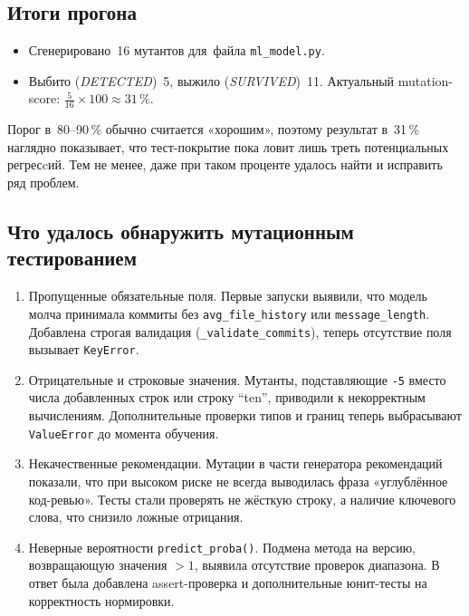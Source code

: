 \vspace{0.7em}
\subsection{Итоги прогона}

\begin{itemize}
	\item Сгенерировано~16 мутантов для~файла \texttt{ml\_model.py}.
	\item Выбито (\textit{DETECTED})~5, выжило (\textit{SURVIVED})~11.  
	Актуальный mutation-score: $\frac{5}{16}\!\times\!100 \approx 31\,\%$.
\end{itemize}

Порог в~80--90\,\% обычно считается «хорошим»,
поэтому результат в~31\,\% наглядно показывает,
что тест-покрытие пока ловит лишь треть потенциальных регресcий.
Тем не менее, даже при таком проценте удалось найти и исправить ряд проблем.

\vspace{0.7em}
\subsection{Что удалось обнаружить мутационным тестированием}

\begin{enumerate}
	\item Пропущенные обязательные поля.
	Первые запуски выявили, что модель молча принимала коммиты без
	\verb|avg_file_history| или \verb|message_length|.  
	Добавлена строгая валидация (\verb|_validate_commits|),
	теперь отсутствие поля вызывает \verb|KeyError|.
	
	\item Отрицательные и строковые значения.
	Мутанты, подставляющие \verb|-5| вместо числа добавленных строк
	или строку ``ten'', приводили к некорректным вычислениям.
	Дополнительные проверки типов и границ теперь
	выбрасывают \verb|ValueError| до момента обучения.
	
	\item Некачественные рекомендации.
	Мутации в части генератора рекомендаций показали,
	что при высоком риске не всегда выводилась фраза
	«углублённое код-ревью». Тесты стали проверять
	не жёсткую строку, а наличие ключевого слова,
	что снизило ложные отрицания.
	
	\item Неверные вероятности \texttt{predict\_proba()}.
	Подмена метода на версию, возвращающую значения $>1$,
	выявила отсутствие проверок диапазона.  
	В ответ была добавлена assert-проверка и дополнительные
	юнит-тесты на корректность нормировки.
\end{enumerate}


